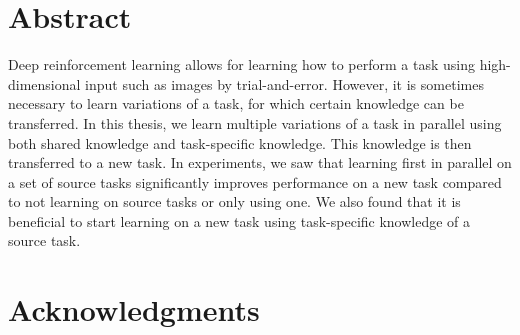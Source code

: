 \documentclass[11pt, a4paper, titlepage, twoside, openright]{book}
\numberwithin{equation}{section}
\providecommand{\keywords}[1]{\textbf{\textit{Index terms---}} #1}
\begin{document}
\frontmatter
\hypersetup{pageanchor=false}

\hypersetup{pageanchor=true}
\setcounter{page}{1}
\chapter*{Abstract}
Deep reinforcement learning allows for learning how to perform a task using high-dimensional input such as images by trial-and-error. However, it is sometimes necessary to learn variations of a task, for which certain knowledge can be transferred. In this thesis, we learn multiple variations of a task in parallel using both shared knowledge and task-specific knowledge. This knowledge is then transferred to a new task. In experiments, we saw that learning first in parallel on a set of source tasks significantly improves performance on a new task compared to not learning on source tasks or only using one. We also found that it is beneficial to start learning on a new task using task-specific knowledge of a source task.

\chapter*{Acknowledgments}


\tableofcontents
\listoffigures
\listofalgorithms
\listoftables

\mainmatter











\backmatter
\printbibliography
\end{document}
